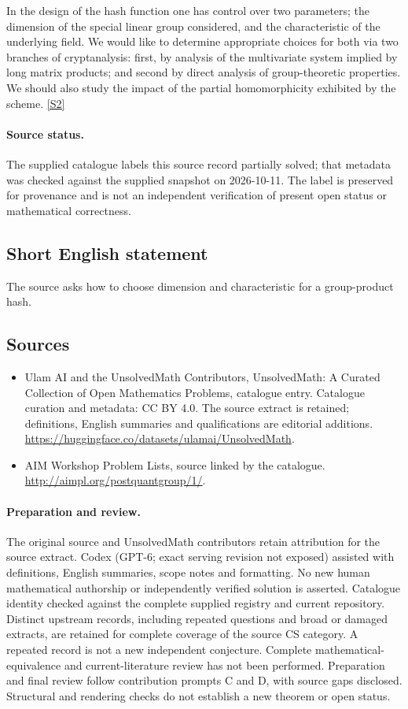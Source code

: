 \documentclass[11pt]{article}
\newcommand{\sref}[2]{\hyperlink{source:#1:#2}{[S#2]}}
\begin{document}
In the design of the hash function one has control over two parameters; the dimension of the special linear group considered, and the characteristic of the underlying field. We would like to determine appropriate choices for both via two branches of cryptanalysis: first, by analysis of the multivariate system implied by long matrix products; and second by direct analysis of group-theoretic properties. We should also study the impact of the partial homomorphicity exhibited by the scheme. \sref{statement}{2}
\paragraph{Source status.}
The supplied catalogue labels this source record partially solved; that metadata was checked against the supplied snapshot on 2026-10-11. The label is preserved for provenance and is not an independent verification of present open status or mathematical correctness.
\subsection{Short English statement}
The source asks how to choose dimension and characteristic for a group-product hash.
\subsection{Sources}
\begin{itemize}
\item[\hypertarget{source:statement:1}{S1}] Ulam AI and the UnsolvedMath Contributors, UnsolvedMath: A Curated Collection of Open Mathematics Problems, catalogue entry. Catalogue curation and metadata: CC BY 4.0. The source extract is retained; definitions, English summaries and qualifications are editorial additions.
\url{https://huggingface.co/datasets/ulamai/UnsolvedMath}.
\item[\hypertarget{source:statement:2}{S2}] AIM Workshop Problem Lists, source linked by the catalogue.
\url{http://aimpl.org/postquantgroup/1/}.
\end{itemize}
\paragraph{Preparation and review.}
The original source and UnsolvedMath contributors retain attribution for the source extract. Codex (GPT-6; exact serving revision not exposed) assisted with definitions, English summaries, scope notes and formatting. No new human mathematical authorship or independently verified solution is asserted. Catalogue identity checked against the complete supplied registry and current repository. Distinct upstream records, including repeated questions and broad or damaged extracts, are retained for complete coverage of the source CS category. A repeated record is not a new independent conjecture. Complete mathematical-equivalence and current-literature review has not been performed. Preparation and final review follow contribution prompts C and D, with source gaps disclosed. Structural and rendering checks do not establish a new theorem or open status.
\label{end:statement}
\end{document}
